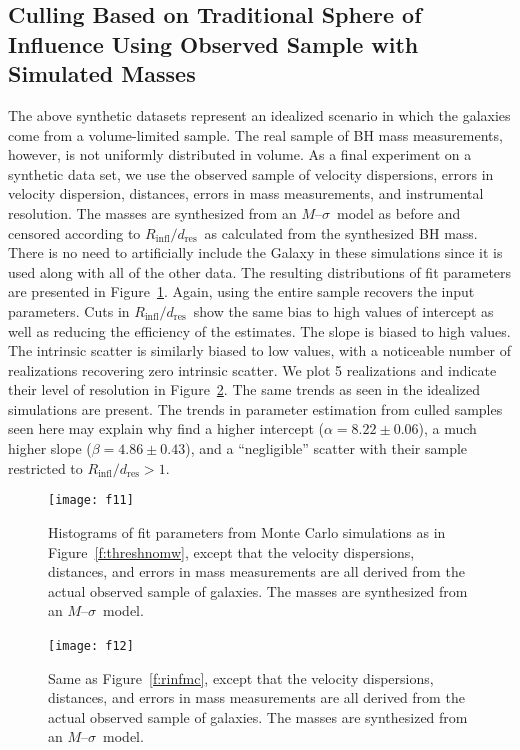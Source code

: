 \documentclass[twosided,letterpaper,numberedappendix]{emulateapj}
\newcommand{\msigma}   {\ensuremath{M}{--}\ensuremath{\sigma}}
\newcommand{\rinfres} {\ensuremath{R_{\mathrm{infl}} / d_{\mathrm{res}}}}
\begin{document}
\subsection{Culling Based on Traditional Sphere of Influence Using Observed Sample with Simulated Masses}
The above synthetic datasets represent an idealized scenario in which
the galaxies come from a volume-limited sample.  The real sample of BH
mass measurements, however, is not uniformly distributed in volume.
As a final experiment on a synthetic data set, we use the observed
sample of velocity dispersions, errors in velocity dispersion,
distances, errors in mass measurements, and instrumental resolution.
The masses are synthesized from an \msigma\ model as before and
censored according to \rinfres\ as calculated from the synthesized BH
mass.  There is no need to artificially include the Galaxy in these
simulations since it is used along with all of the other data.  The
resulting distributions of fit parameters are presented in
Figure~\ref{f:realnomw}.  Again, using the entire sample recovers the
input parameters.  Cuts in \rinfres\ show the same bias to high values
of intercept as well as reducing the efficiency of the estimates.  The
slope is biased to high values.  The intrinsic scatter is similarly
biased to low values, with a noticeable number of realizations
recovering zero intrinsic scatter.  We plot 5 realizations and
indicate their level of resolution in Figure~\ref{f:realrinfmc}.  The
same trends as seen in the idealized simulations are present.  The
trends in parameter estimation from culled samples seen here may
explain why \citet{ff05} find a higher intercept ($\alpha = 8.22 \pm
0.06$), a much higher slope ($\beta = 4.86 \pm 0.43$), and a
``negligible'' scatter with their sample restricted to $\rinfres > 1$.



\begin{figure}
\centering
\hbox{\hspace{-1.5cm}\texttt{[image: f11]}}
\caption{Histograms of fit parameters from Monte Carlo simulations as
in Figure~\ref{f:threshnomw}, except that the velocity dispersions,
distances, and errors in mass measurements are all derived from the
actual observed sample of galaxies.  The masses are synthesized from
an \msigma\ model.
\bigskip
}
\label{f:realnomw}
\end{figure}



\begin{figure}
\centering
\hbox{\hspace{-1.5cm}\texttt{[image: f12]}
}
\caption{Same as Figure~\ref{f:rinfmc}, except that the velocity dispersions,
distances, and errors in mass measurements are all derived from the
actual observed sample of galaxies.  The masses are synthesized from
an \msigma\ model.}

\label{f:realrinfmc}
\end{figure}
\end{document}
